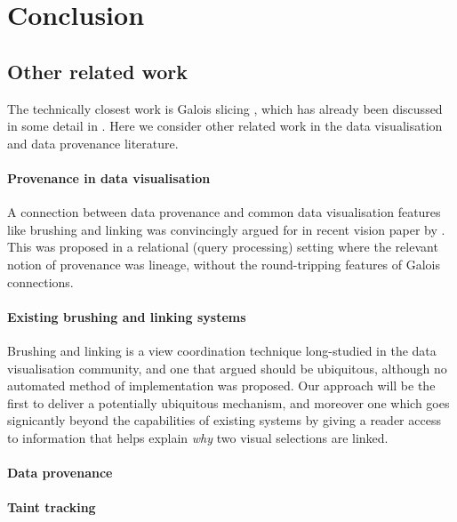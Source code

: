 \section{Conclusion}
\label{sec:conclusion}

\subsection{Other related work}

The technically closest work is Galois slicing \cite{perera12a,ricciotti17,perera16d}, which has already been discussed in some detail in . Here we consider other related work in the data visualisation and data provenance literature.

\paragraph{Provenance in data visualisation}

A connection between data provenance and common data visualisation features like brushing and linking was convincingly argued for in recent vision paper by \citet{psallidas18}. This was proposed in a relational (query processing) setting where the relevant notion of provenance was lineage, without the round-tripping features of Galois connections.

\paragraph{Existing brushing and linking systems}

Brushing and linking is a view coordination technique long-studied in the data visualisation community, and one that \citet{roberts06} argued should be ubiquitous, although no automated method of implementation was proposed. Our approach will be the first to deliver a potentially ubiquitous mechanism, and moreover one which goes signicantly beyond the capabilities of existing systems by giving a reader access to information that helps explain \emph{why} two visual selections are linked.

\paragraph{Data provenance}

\paragraph{Taint tracking}


